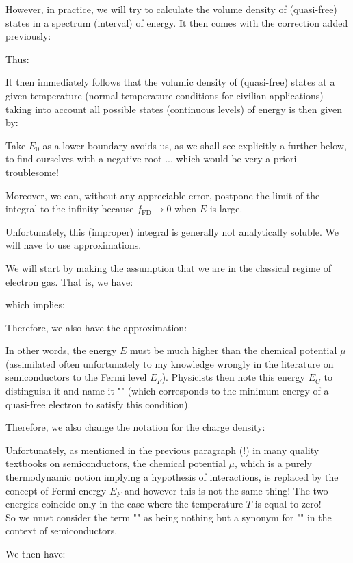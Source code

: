 	However, in practice, we will try to calculate the volume density of (quasi-free) states in a spectrum (interval) of energy. It then comes with the correction added previously:
	
	Thus:
	
	It then immediately follows that the volumic density of (quasi-free) states at a given temperature (normal temperature conditions for civilian applications) taking into account all possible states (continuous levels) of energy is then given by:
	
	Take $E_0$ as a lower boundary avoids us, as we shall see explicitly a further below, to find ourselves with a negative root ... which would be very a priori troublesome!

	Moreover, we can, without any appreciable error, postpone the limit of the integral to the infinity because $f_{\text{FD}}\rightarrow 0$ when $E$ is large.

	Unfortunately, this (improper) integral is generally not analytically soluble. We will have to use approximations.

	We will start by making the assumption that we are in the classical regime of electron gas. That is, we have:
	
	which implies:
	
	Therefore, we also have the approximation:
	
	In other words, the energy $E$ must be much higher than the chemical potential $\mu$ (assimilated often unfortunately to my knowledge wrongly in the literature on semiconductors to the Fermi level $E_F$). Physicists then note this energy $E_C$ to distinguish it and name it "" (which corresponds to the minimum energy of a quasi-free electron to satisfy this condition).

	Therefore, we also change the notation for the charge density:
	
	\begin{tcolorbox}[title=Remark,colframe=black,arc=10pt]
	Unfortunately, as mentioned in the previous paragraph (!) in many quality textbooks on semiconductors, the chemical potential $\mu$, which is a purely thermodynamic notion implying a hypothesis of interactions, is replaced by the concept of Fermi energy $E_F$ and however this is not the same thing! The two energies coincide only in the case where the temperature $T$ is equal to zero!\\

	So we must consider the term "" as being nothing but a synonym for "" in the context of semiconductors.
	\end{tcolorbox}
	We then have:
	
